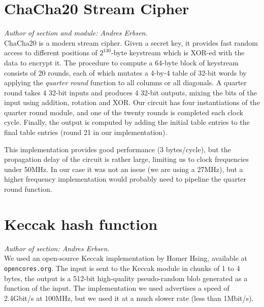 \section{ChaCha20 Stream Cipher}\label{chacha20-stream-cipher}

\emph{Author of section and module: Andres Erbsen.}\\ChaCha20 is a
modern stream cipher. Given a secret key, it provides fast random access
to different positions of \(2^{130}\)-byte keystream which is XOR-ed
with the data to encrypt it. The procedure to compute a 64-byte block of
keystream consists of 20 rounds, each of which mutates a 4-by-4 table of
32-bit words by applying the \emph{quarter round} function to all
columns or all diagonals. A quarter round takes 4 32-bit inputs and
produces 4 32-bit outputs, mixing the bits of the input using addition,
rotation and XOR. Our circuit has four instantiations of the quarter
round module, and one of the twenty rounds is completed each clock
cycle. Finally, the output is computed by adding the initial table
entries to the final table entries (round 21 in our implementation).

This implementation provides good performance (3 bytes/cycle), but the
propagation delay of the circuit is rather large, limiting us to clock
frequencies under 50MHz. In our case it was not an issue (we are using a
27MHz), but a higher frequency implementation would probably need to
pipeline the quarter round function.

\section{Keccak hash function}\label{keccak-hash-function}

\emph{Author of section: Andres Erbsen.}\\We used an open-source Keccak
implementation by Homer Hsing, available at \texttt{opencores.org}. The
input is sent to the Keccak module in chunks of 1 to 4 bytes, the output
is a 512-bit high-quality pseudo-random blob generated as a function of
the input. The implementation we used advertises a speed of 2.4Gbit/s at
100MHz, but we used it at a much slower rate (less than 1Mbit/s).
